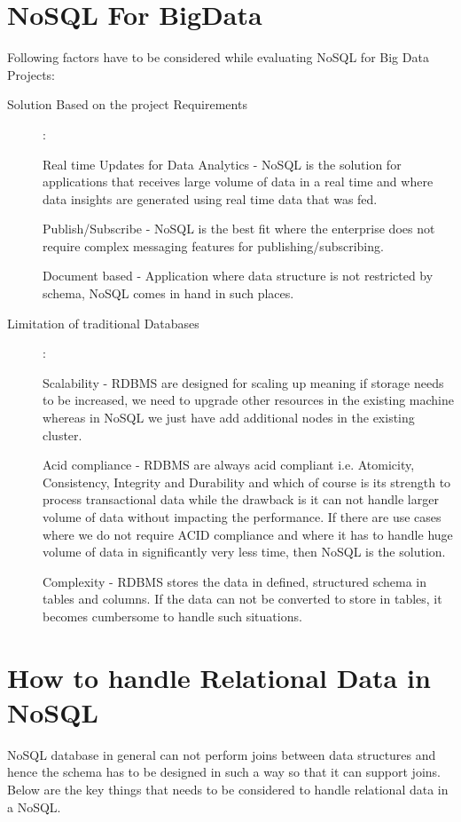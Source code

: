 \documentclass[sigconf]{acmart}
\begin{document}
\section{NoSQL For BigData}
Following factors have to be considered while evaluating NoSQL for Big Data Projects:
\begin{description}

    \item[Solution Based on the project Requirements]:

    Real time Updates for Data Analytics - NoSQL is the solution for applications that receives large volume of data in a real time and where data insights are generated using real time data that was fed.

    Publish/Subscribe - NoSQL is the best fit where the enterprise does not require complex messaging features for publishing/subscribing.

    Document based - Application where data structure is not restricted by schema, NoSQL comes in hand in such places.


    \item[Limitation of traditional Databases] :

    Scalability - RDBMS are designed for scaling up meaning if storage needs to be increased, we need to upgrade other resources in the existing machine whereas in NoSQL we just have add additional nodes in the existing cluster. 

    Acid compliance - RDBMS are always acid compliant i.e. Atomicity, Consistency, Integrity and Durability and which of course is its strength to process transactional data while the drawback is it can not handle larger volume of data without impacting the performance. If there are use cases where we do not require ACID compliance and  where it has to handle huge volume of data in significantly very less time, then NoSQL is the solution.

    Complexity - RDBMS stores the data in defined, structured schema in tables and columns. If the data can not be converted to store in tables, it becomes cumbersome to handle such situations. 

\end{description}

\section{How to handle Relational Data in NoSQL}
NoSQL database in general can not perform joins between data structures and hence the schema has to be designed in such a way so that it can support joins. Below are the key things that needs to be considered to handle relational data in a NoSQL.
\end{document}
